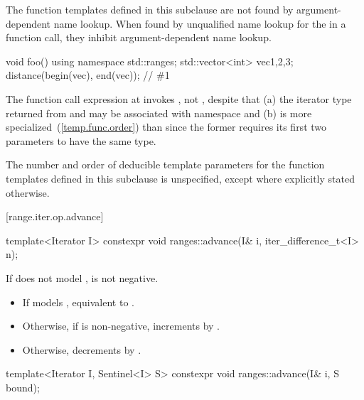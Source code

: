 \pnum
The function templates defined in this subclause are not found by
argument-dependent name lookup. When found by
unqualified name lookup for the
 in a function call, they
inhibit argument-dependent name lookup.

\begin{example}
\begin{codeblock}
void foo() {
    using namespace std::ranges;
    std::vector<int> vec{1,2,3};
    distance(begin(vec), end(vec));     // \#1
}
\end{codeblock}
The function call expression at  invokes ,
not , despite that
(a) the iterator type returned from  and 
may be associated with namespace  and
(b)  is more specialized~(\ref{temp.func.order}) than
 since the former requires its first two parameters
to have the same type.
\end{example}

\pnum
The number and order of deducible template parameters for the function templates defined
in this subclause is unspecified, except where explicitly stated otherwise.

[range.iter.op.advance]{}

%
\begin{itemdecl}
template<Iterator I>
  constexpr void ranges::advance(I& i, iter_difference_t<I> n);
\end{itemdecl}

\begin{itemdescr}
\pnum
\expects
If  does not model ,
 is not negative.

\pnum
\effects
\begin{itemize}
\item If  models ,
  equivalent to .
\item Otherwise, if  is non-negative, increments
   by .
\item Otherwise, decrements  by .
\end{itemize}
\end{itemdescr}

%
\begin{itemdecl}
template<Iterator I, Sentinel<I> S>
  constexpr void ranges::advance(I& i, S bound);
\end{itemdecl}

